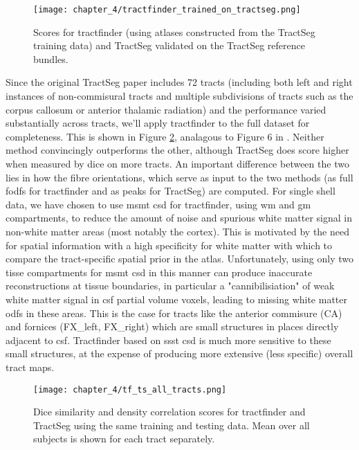 \begin{figure}[htb!]
  \texttt{[image: chapter\_4/tractfinder\_trained\_on\_tractseg.png]}
  \caption{Scores for tractfinder (using atlases constructed from the TractSeg training data) and TractSeg validated on the TractSeg reference bundles.}
  \label{fig:ts_atlas}
\end{figure}

Since the original TractSeg paper includes 72 tracts (including both left and right instances of non-commisural tracts and multiple subdivisions of tracts such as the corpus callosum or anterior thalamic radiation) and the performance varied substantially across tracts, we'll apply tractfinder to the full dataset for completeness.
This is shown in Figure \ref{fig:ts_all_tracts}, analagous to Figure 6 in \textcite{Wasserthal2018}.
Neither method convincingly outperforms the other, although TractSeg does score higher when measured by \gls{dice} on more tracts.
An important difference between the two lies in how the fibre orientations, which serve as input to the two methods (as full \glspl{fodf} for tractfinder and as peaks for TractSeg) are computed.
For single shell data, we have chosen to use \gls{msmt} \gls{csd} for tractfinder, using \gls{wm} and \gls{gm} compartments, to reduce the amount of noise and spurious white matter signal in non-white matter areas (most notably the cortex).
This is motivated by the need for spatial information with a high specificity for white matter with which to compare the tract-specific spatial prior in the atlas.
Unfortunately, using only two tisse compartments for \gls{msmt} \gls{csd} in this manner can produce inaccurate reconstructions at tissue boundaries, in particular a "cannibilisiation" of weak white matter signal in \gls{csf} partial volume voxels, leading to missing white matter \glspl{odf} in these areas.
This is the case for tracts like the anterior commisure (CA) and fornices (FX\_left, FX\_right) which are small structures in places directly adjacent to \gls{csf}.
Tractfinder based on \gls{ssst} \gls{csd} is much more sensitive to these small structures, at the expense of producing more extensive (less specific) overall tract maps.

\begin{figure}[h!]
  \centering
  \texttt{[image: chapter\_4/tf\_ts\_all\_tracts.png]}
  \caption{ Dice similarity and density correlation scores for tractfinder and TractSeg using the same training and testing data. Mean over all subjects is shown for each tract separately.}
  \label{fig:ts_all_tracts}
\end{figure}


